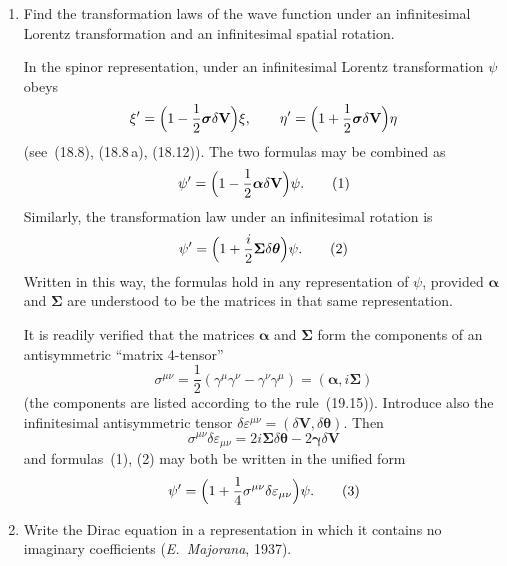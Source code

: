 \ProblemHeading

\begin{enumerate}
\item Find the transformation laws of the wave function under an infinitesimal Lorentz transformation and an infinitesimal spatial rotation.

\SolutionHeading In the spinor representation, under an infinitesimal Lorentz transformation $\psi$ obeys
\[
\xi' = \Bigl(1 - \frac{1}{2}\boldsymbol{\sigma}\delta\mathbf{V}\Bigr)\xi,\qquad \eta' = \Bigl(1 + \frac{1}{2}\boldsymbol{\sigma}\delta\mathbf{V}\Bigr)\eta
\]
(see~(18.8), (18.8\,a), (18.12)). The two formulas may be combined as
\begin{equation}
\psi' = \Bigl(1 - \frac{1}{2}\boldsymbol{\alpha}\delta\mathbf{V}\Bigr)\psi.
\tag*{(1)}
\end{equation}
Similarly, the transformation law under an infinitesimal rotation is
\begin{equation}
\psi' = \Bigl(1 + \frac{i}{2}\boldsymbol{\Sigma}\delta\boldsymbol{\theta}\Bigr)\psi.
\tag*{(2)}
\end{equation}
Written in this way, the formulas hold in any representation of $\psi$, provided $\boldsymbol{\alpha}$ and $\boldsymbol{\Sigma}$ are understood to be the matrices in that same representation.

It is readily verified that the matrices $\boldsymbol{\alpha}$ and $\boldsymbol{\Sigma}$ form the components of an antisymmetric ``matrix 4-tensor''
\[
\sigma^{\mu\nu} = \frac{1}{2}(\gamma^\mu\gamma^\nu - \gamma^\nu\gamma^\mu) = (\boldsymbol{\alpha}, i\boldsymbol{\Sigma})
\]
(the components are listed according to the rule~(19.15)). Introduce also the infinitesimal antisymmetric tensor $\delta\varepsilon^{\mu\nu} = (\delta\mathbf{V}, \delta\boldsymbol{\theta})$. Then
\[
\sigma^{\mu\nu}\delta\varepsilon_{\mu\nu} = 2i\boldsymbol{\Sigma}\delta\boldsymbol{\theta} - 2\boldsymbol{\gamma}\delta\mathbf{V}
\]
and formulas~(1), (2) may both be written in the unified form
\begin{equation}
\psi' = \Bigl(1 + \frac{1}{4}\sigma^{\mu\nu}\delta\varepsilon_{\mu\nu}\Bigr)\psi.
\tag*{(3)}
\end{equation}

\item Write the Dirac equation in a representation in which it contains no imaginary coefficients (\emph{E.~Majorana}, 1937).


\end{enumerate}
